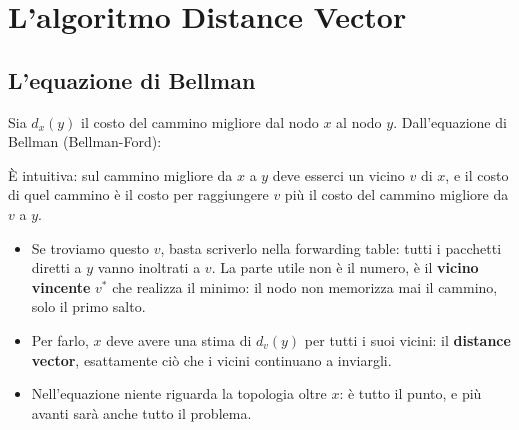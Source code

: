 \section{L'algoritmo Distance Vector}


\subsection{L'equazione di Bellman}

Sia $d_x(y)$ il costo del cammino migliore dal nodo $x$ al nodo $y$. Dall'equazione di Bellman (Bellman-Ford):


È intuitiva: sul cammino migliore da $x$ a $y$ deve esserci un vicino $v$ di $x$, e il costo di quel cammino è il costo per
raggiungere $v$ più il costo del cammino migliore da $v$ a $y$.

\begin{itemize}
    \item Se troviamo questo $v$, basta scriverlo nella forwarding table: tutti i pacchetti diretti a $y$ vanno inoltrati a $v$.
          La parte utile non è il numero, è il \textbf{vicino vincente} $v^*$ che realizza il minimo: il nodo non memorizza mai il
          cammino, solo il primo salto.
    \item Per farlo, $x$ deve avere una stima di $d_v(y)$ per tutti i suoi vicini: il \textbf{distance vector}, esattamente ciò che
          i vicini continuano a inviargli.
    \item Nell'equazione niente riguarda la topologia oltre $x$: è tutto il punto, e più avanti sarà anche tutto il problema.
\end{itemize}

